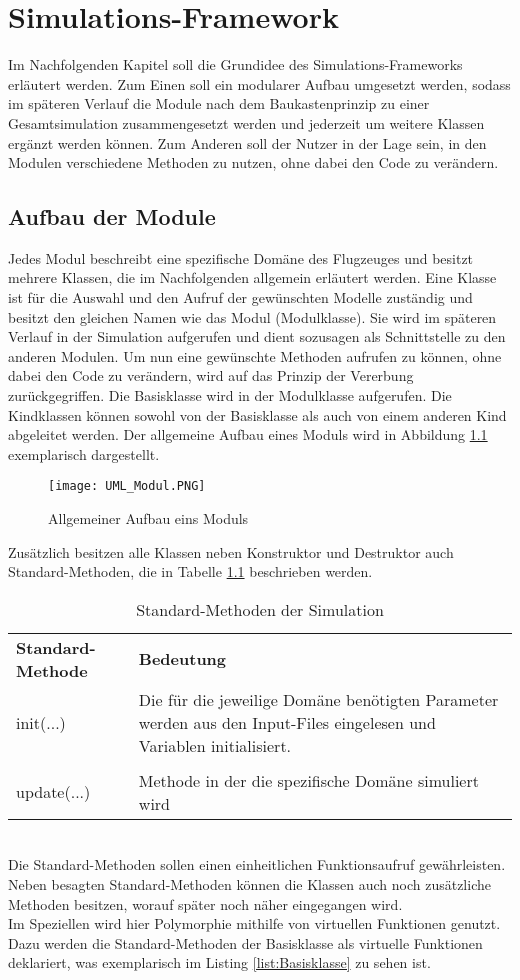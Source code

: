 \chapter{Simulations-Framework}
\label{ch:Simulations-Framework}
Im Nachfolgenden Kapitel soll die Grundidee des Simulations-Frameworks erläutert werden. Zum Einen soll ein modularer Aufbau umgesetzt werden, sodass im späteren Verlauf die Module nach dem Baukastenprinzip zu einer Gesamtsimulation zusammengesetzt werden und jederzeit um weitere Klassen ergänzt werden können. Zum Anderen soll der Nutzer in der Lage sein, in den Modulen verschiedene Methoden zu nutzen, ohne dabei den Code zu verändern.
\section{Aufbau der Module}
\label{sec:AufbauModule}
Jedes Modul beschreibt eine spezifische Domäne des Flugzeuges und  besitzt mehrere Klassen, die im Nachfolgenden allgemein erläutert werden. Eine Klasse ist für die Auswahl und den Aufruf der gewünschten Modelle zuständig und besitzt den gleichen Namen wie das Modul (Modulklasse). Sie wird im späteren Verlauf in der Simulation aufgerufen und dient sozusagen als Schnittstelle zu den anderen Modulen. Um nun eine gewünschte Methoden aufrufen zu können, ohne dabei den Code zu verändern, wird auf das Prinzip der Vererbung  zurückgegriffen. Die Basisklasse wird in der Modulklasse aufgerufen. Die Kindklassen können sowohl von der Basisklasse als auch von einem anderen Kind abgeleitet werden. Der allgemeine Aufbau eines Moduls wird in Abbildung  \ref{fig:UML_Modul} exemplarisch dargestellt.
 \begin{figure}[h]
 	 \centering\texttt{[image: UML\_Modul.PNG]}
 	 \caption{Allgemeiner Aufbau eins Moduls }
 	 \label{fig:UML_Modul}
 \end{figure} \newpage
Zusätzlich besitzen alle Klassen neben Konstruktor und Destruktor auch Standard-Methoden, die in Tabelle \ref{tab:Standardmethoden} beschrieben werden.
\begin{table}[h]
	\centering	\begin{tabular}{l p{10cm}}
		\textbf{Standard-Methode} & \textbf{Bedeutung}\\
		init(...) & Die für die jeweilige Domäne benötigten Parameter werden aus den Input-Files eingelesen und Variablen initialisiert.\\\\
		update(...) & Methode in der die spezifische Domäne  simuliert wird	\end{tabular}
	\caption{Standard-Methoden der Simulation}
	\label{tab:Standardmethoden}
\end{table}\\
Die Standard-Methoden sollen einen einheitlichen Funktionsaufruf gewährleisten. Neben besagten Standard-Methoden können die Klassen auch noch zusätzliche Methoden besitzen, worauf später noch näher eingegangen wird. \\
Im Speziellen wird hier Polymorphie mithilfe von virtuellen Funktionen genutzt. Dazu werden die Standard-Methoden der Basisklasse als virtuelle Funktionen deklariert, was exemplarisch im Listing \ref{list:Basisklasse} zu sehen ist.\newpage

